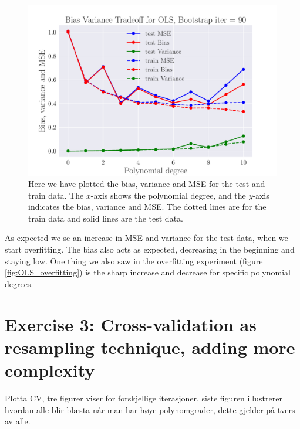 \documentclass[reprint,english,notitlepage,aps,nobalancelastpage,nofootinbib]{revtex4-1}  %
\begin{document}
\begin{figure}[H]
	\includegraphics[width=\linewidth]{BVT_OLS_n30_eps0_2.pdf}
	\caption{Here we have plotted the bias, variance and MSE for the test and train data. The $x$-axis shows the polynomial degree, and the $y$-axis indicates the bias, variance and MSE. The dotted lines are for the train data and solid lines are the test data.}\label{fig:BV_OLS}
\end{figure}

As expected we se an increase in MSE and variance for the test data, when we start overfitting. The bias also acts as expected, decreasing in the beginning and staying low. One thing we also saw in the overfitting experiment (figure \ref{fig:OLS_overfitting}) is the sharp increase and decrease for specific polynomial degrees.

\section*{Exercise 3: Cross-validation as resampling technique, adding more complexity}

Plotta CV, tre figurer viser for forskjellige iterasjoner, siste figuren illustrerer hvordan alle blir blæsta når man har høye polynomgrader, dette gjelder på tvers av alle.
\end{document}

